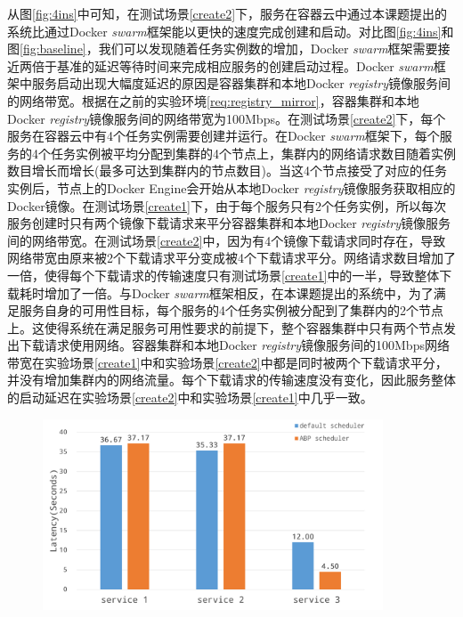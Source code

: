从图\ref{fig:4ins}中可知，在测试场景\ref{create2}下，服务在容器云中通过本课题提出的系统比通过Docker \emph{swarm}框架能以更快的速度完成创建和启动。对比图\ref{fig:4ins}和图\ref{fig:baseline}，我们可以发现随着任务实例数的增加，Docker \emph{swarm}框架需要接近两倍于基准的延迟等待时间来完成相应服务的创建启动过程。Docker \emph{swarm}框架中服务启动出现大幅度延迟的原因是容器集群和本地Docker \emph{registry}镜像服务间的网络带宽。根据在之前的实验环境\ref{req:registry_mirror}，容器集群和本地Docker \emph{registry}镜像服务间的网络带宽为100Mbps。在测试场景\ref{create2}下，每个服务在容器云中有4个任务实例需要创建并运行。在Docker \emph{swarm}框架下，每个服务的4个任务实例被平均分配到集群的4个节点上，集群内的网络请求数目随着实例数目增长而增长(最多可达到集群内的节点数目)。当这4个节点接受了对应的任务实例后，节点上的Docker Engine会开始从本地Docker \emph{registry}镜像服务获取相应的Docker镜像。在测试场景\ref{create1}下，由于每个服务只有2个任务实例，所以每次服务创建时只有两个镜像下载请求来平分容器集群和本地Docker \emph{registry}镜像服务间的网络带宽。在测试场景\ref{create2}中，因为有4个镜像下载请求同时存在，导致网络带宽由原来被2个下载请求平分变成被4个下载请求平分。网络请求数目增加了一倍，使得每个下载请求的传输速度只有测试场景\ref{create1}中的一半，导致整体下载耗时增加了一倍。与Docker \emph{swarm}框架相反，在本课题提出的系统中，为了满足服务自身的可用性目标，每个服务的4个任务实例被分配到了集群内的2个节点上。这使得系统在满足服务可用性要求的前提下，整个容器集群中只有两个节点发出下载请求使用网络。容器集群和本地Docker \emph{registry}镜像服务间的100Mbps网络带宽在实验场景\ref{create1}中和实验场景\ref{create2}中都是同时被两个下载请求平分，并没有增加集群内的网络流量。每个下载请求的传输速度没有变化，因此服务整体的启动延迟在实验场景\ref{create2}中和实验场景\ref{create1}中几乎一致。

\begin{figure}[htbp]
\centering
\includegraphics[width=0.9\textwidth]{./figure/132}
\end{figure}


